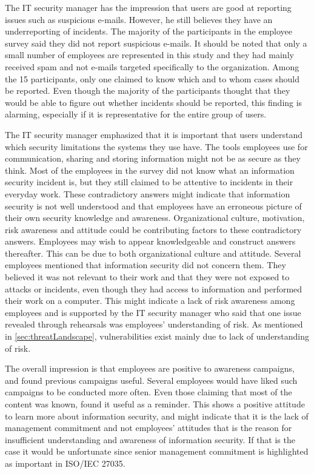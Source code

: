 The IT security manager has the impression that users are good at reporting issues such as suspicious e-mails. However, he still believes they have an underreporting of incidents. The majority of the participants in the employee survey said they did not report suspicious e-mails. It should be noted that only a small number of employees are represented in this study and they had mainly received spam and not e-mails targeted specifically to the organization. Among the 15 participants, only one claimed to know which and to whom cases should be reported. Even though the majority of the participants thought that they would be able to figure out whether incidents should be reported, this finding is alarming, especially if it is representative for the entire group of users.

The IT security manager emphasized that it is important that users understand which security limitations the systems they use have. The tools employees use for communication, sharing and storing information might not be as secure as they think. Most of the employees in the survey did not know what an information security incident is, but they still claimed to be attentive to incidents in their everyday work. These contradictory answers might indicate that information security is not well understood and that employees have an erroneous picture of their own security knowledge and awareness. Organizational culture, motivation, risk awareness and attitude could be contributing factors to these contradictory answers. Employees may wish to appear knowledgeable and construct answers thereafter. This can be due to both organizational culture and attitude. Several employees mentioned that information security did not concern them. They believed it was not relevant to their work and that they were not exposed to attacks or incidents, even though they had access to information and performed their work on a computer. This might indicate a lack of risk awareness among employees and is supported by the IT security manager who said that one issue revealed through rehearsals was employees' understanding of risk. As mentioned in \ref{sec:threatLandscape}, vulnerabilities exist mainly due to lack of understanding of risk.

The overall impression is that employees are positive to awareness campaigns, and found previous campaigns useful. Several employees would have liked such campaigns to be conducted more often. Even those claiming that most of the content was known, found it useful as a reminder. This shows a positive attitude to learn more about information security, and might indicate that it is the lack of management commitment and not employees' attitudes that is the reason for insufficient understanding and awareness of information security. If that is the case it would be unfortunate since senior management commitment is highlighted as important in ISO/IEC 27035.

